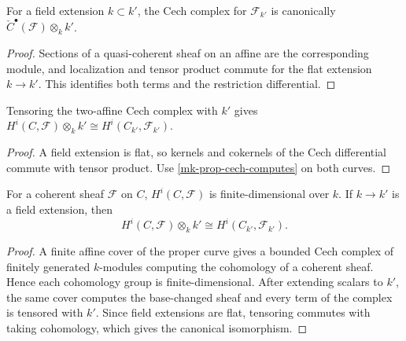 \begin{proposition}
  \label{mk-prop-cech-flat-base-change}
  \cite{stacks-cohomology-schemes}
  For a field extension \(k\subset k'\), the Cech complex for
  \(\mathcal F_{k'}\) is canonically
  \(\check C^\bullet(\mathcal F)\otimes_k k'\).
\end{proposition}

\begin{proof}
  Sections of a quasi-coherent sheaf on an affine are the corresponding
  module, and localization and tensor product commute for the flat extension
  \(k\to k'\).  This identifies both terms and the restriction differential.
\end{proof}

\begin{lemma}
  \label{mk-lem-cech-flat-cohomology}
  \cite{stacks-cohomology-schemes}
  Tensoring the two-affine Cech complex with \(k'\) gives
  \(H^i(C,\mathcal F)\otimes_k k'\cong H^i(C_{k'},\mathcal F_{k'})\).
\end{lemma}

\begin{proof}
  A field extension is flat, so kernels and cokernels of the Cech differential
  commute with tensor product.  Use \ref{mk-prop-cech-computes} on both curves.
\end{proof}

\begin{theorem}
  \label{mk-thm-cohomology-base-change}
  \cite{stacks-project,stacks-cohomology-schemes}
  For a coherent sheaf \(\mathcal F\) on \(C\), \(H^i(C,\mathcal F)\) is
  finite-dimensional over \(k\).  If \(k\to k'\) is a field extension, then
  \[
    H^i(C,\mathcal F)\otimes_k k'\cong
    H^i(C_{k'},\mathcal F_{k'}).
  \]
\end{theorem}

\begin{proof}
  A finite affine cover of the proper curve gives a bounded Cech complex of
  finitely generated \(k\)-modules computing the cohomology of a coherent
  sheaf.  Hence each cohomology group is finite-dimensional.  After extending
  scalars to \(k'\), the same cover computes the base-changed sheaf and every
  term of the complex is tensored with \(k'\).  Since field extensions are
  flat, tensoring commutes with taking cohomology, which gives the canonical
  isomorphism.
\end{proof}

